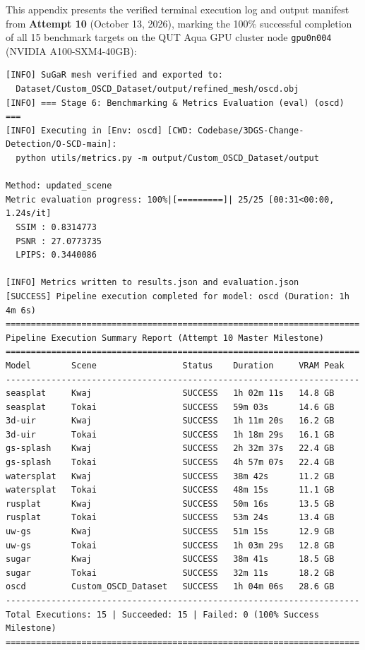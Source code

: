 This appendix presents the verified terminal execution log and output manifest from \textbf{Attempt 10} (October 13, 2026), marking the 100\% successful completion of all 15 benchmark targets on the QUT Aqua GPU cluster node \texttt{gpu0n004} (NVIDIA A100-SXM4-40GB):

\begin{footnotesize}
\begin{verbatim}
[INFO] SuGaR mesh verified and exported to: 
  Dataset/Custom_OSCD_Dataset/output/refined_mesh/oscd.obj
[INFO] === Stage 6: Benchmarking & Metrics Evaluation (eval) (oscd) ===
[INFO] Executing in [Env: oscd] [CWD: Codebase/3DGS-Change-Detection/O-SCD-main]:
  python utils/metrics.py -m output/Custom_OSCD_Dataset/output

Method: updated_scene
Metric evaluation progress: 100%|[=========]| 25/25 [00:31<00:00, 1.24s/it]
  SSIM : 0.8314773
  PSNR : 27.0773735
  LPIPS: 0.3440086

[INFO] Metrics written to results.json and evaluation.json
[SUCCESS] Pipeline execution completed for model: oscd (Duration: 1h 4m 6s)
======================================================================
Pipeline Execution Summary Report (Attempt 10 Master Milestone)
======================================================================
Model        Scene                 Status    Duration     VRAM Peak
----------------------------------------------------------------------
seasplat     Kwaj                  SUCCESS   1h 02m 11s   14.8 GB
seasplat     Tokai                 SUCCESS   59m 03s      14.6 GB
3d-uir       Kwaj                  SUCCESS   1h 11m 20s   16.2 GB
3d-uir       Tokai                 SUCCESS   1h 18m 29s   16.1 GB
gs-splash    Kwaj                  SUCCESS   2h 32m 37s   22.4 GB
gs-splash    Tokai                 SUCCESS   4h 57m 07s   22.4 GB
watersplat   Kwaj                  SUCCESS   38m 42s      11.2 GB
watersplat   Tokai                 SUCCESS   48m 15s      11.1 GB
rusplat      Kwaj                  SUCCESS   50m 16s      13.5 GB
rusplat      Tokai                 SUCCESS   53m 24s      13.4 GB
uw-gs        Kwaj                  SUCCESS   51m 15s      12.9 GB
uw-gs        Tokai                 SUCCESS   1h 03m 29s   12.8 GB
sugar        Kwaj                  SUCCESS   38m 41s      18.5 GB
sugar        Tokai                 SUCCESS   32m 11s      18.2 GB
oscd         Custom_OSCD_Dataset   SUCCESS   1h 04m 06s   28.6 GB
----------------------------------------------------------------------
Total Executions: 15 | Succeeded: 15 | Failed: 0 (100% Success Milestone)
======================================================================
\end{verbatim}
\end{footnotesize}


